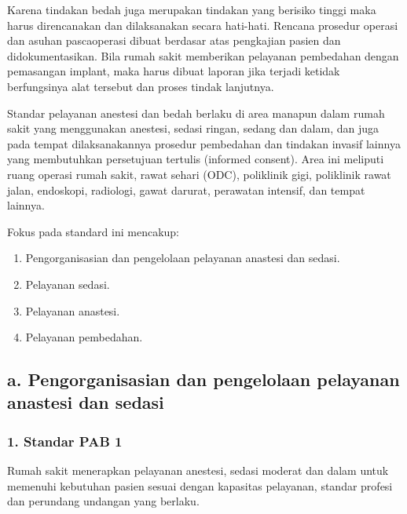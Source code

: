 \documentclass[
]{book}
\providecommand{\tightlist}{%
  \setlength{\itemsep}{0pt}\setlength{\parskip}{0pt}}
\begin{document}
Karena tindakan bedah juga merupakan tindakan yang berisiko tinggi maka harus direncanakan dan dilaksanakan secara hati-hati. Rencana prosedur operasi dan asuhan pascaoperasi dibuat berdasar atas pengkajian pasien dan didokumentasikan. Bila rumah sakit memberikan pelayanan pembedahan dengan pemasangan implant, maka harus dibuat laporan jika terjadi ketidak berfungsinya alat tersebut dan proses tindak lanjutnya.

Standar pelayanan anestesi dan bedah berlaku di area manapun dalam rumah sakit yang menggunakan anestesi, sedasi ringan, sedang dan dalam, dan juga pada tempat dilaksanakannya prosedur pembedahan dan tindakan invasif lainnya yang membutuhkan persetujuan tertulis (informed consent). Area ini meliputi ruang operasi rumah sakit, rawat sehari (ODC), poliklinik gigi, poliklinik rawat jalan, endoskopi, radiologi, gawat darurat, perawatan intensif, dan tempat lainnya.

Fokus pada standard ini mencakup:

\begin{enumerate}
\def\labelenumi{\alph{enumi}.}
\tightlist
\item
  Pengorganisasian dan pengelolaan pelayanan anastesi dan sedasi.
\item
  Pelayanan sedasi.
\item
  Pelayanan anastesi.
\item
  Pelayanan pembedahan.
\end{enumerate}

\hypertarget{a.-pengorganisasian-dan-pengelolaan-pelayanan-anastesi-dan-sedasi}{%
\subsection*{a. Pengorganisasian dan pengelolaan pelayanan anastesi dan sedasi}\label{a.-pengorganisasian-dan-pengelolaan-pelayanan-anastesi-dan-sedasi}}

\hypertarget{standar-pab-1}{%
\subsubsection*{1. Standar PAB 1}\label{standar-pab-1}}

Rumah sakit menerapkan pelayanan anestesi, sedasi moderat dan dalam untuk memenuhi kebutuhan pasien sesuai dengan kapasitas pelayanan, standar profesi dan perundang undangan yang berlaku.
\end{document}

